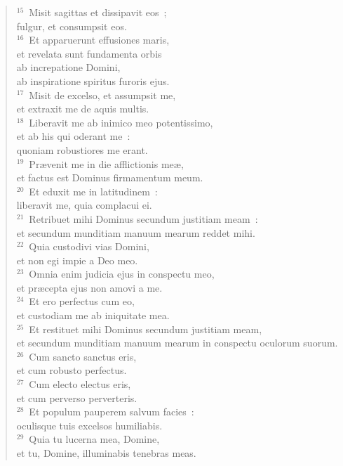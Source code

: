 \begin{flushleft}
\begin{verse}
${}^{15}$~Misit sagittas et dissipavit eos~;\\ fulgur, et consumpsit eos.\\
${}^{16}$~Et apparuerunt effusiones maris,\\ et revelata sunt fundamenta orbis\\ ab increpatione Domini,\\ ab inspiratione spiritus furoris ejus.\\
${}^{17}$~Misit de excelso, et assumpsit me,\\ et extraxit me de aquis multis.\\
${}^{18}$~Liberavit me ab inimico meo potentissimo,\\ et ab his qui oderant me~:\\ quoniam robustiores me erant.\\
${}^{19}$~Pr\ae venit me in die afflictionis me\ae ,\\ et factus est Dominus firmamentum meum.\\
${}^{20}$~Et eduxit me in latitudinem~:\\ liberavit me, quia complacui ei.\\
${}^{21}$~Retribuet mihi Dominus secundum justitiam meam~:\\ et secundum munditiam manuum mearum reddet mihi.\\
${}^{22}$~Quia custodivi vias Domini,\\ et non egi impie a Deo meo.\\
${}^{23}$~Omnia enim judicia ejus in conspectu meo,\\ et pr\ae cepta ejus non amovi a me.\\
${}^{24}$~Et ero perfectus cum eo,\\ et custodiam me ab iniquitate mea.\\
${}^{25}$~Et restituet mihi Dominus secundum justitiam meam,\\ et secundum munditiam manuum mearum in conspectu oculorum suorum.\\
${}^{26}$~Cum sancto sanctus eris,\\ et cum robusto perfectus.\\
${}^{27}$~Cum electo electus eris,\\ et cum perverso perverteris.\\
${}^{28}$~Et populum pauperem salvum facies~:\\ oculisque tuis excelsos humiliabis.\\
${}^{29}$~Quia tu lucerna mea, Domine,\\ et tu, Domine, illuminabis tenebras meas.\\

\end{verse}
\end{flushleft}
